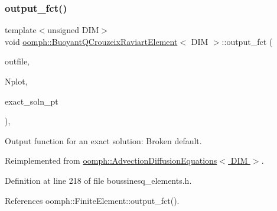 \subsubsection{\texorpdfstring{output\+\_\+fct()}{output\_fct()}\hspace{0.1cm}{\footnotesize\ttfamily [1/2]}}
{\footnotesize\ttfamily template$<$unsigned D\+IM$>$ \\
void \hyperlink{classoomph_1_1BuoyantQCrouzeixRaviartElement}{oomph\+::\+Buoyant\+Q\+Crouzeix\+Raviart\+Element}$<$ D\+IM $>$\+::output\+\_\+fct (\begin{DoxyParamCaption}\item[{std\+::ostream \&}]{outfile,  }\item[{const unsigned \&}]{Nplot,  }\item[{\hyperlink{classoomph_1_1FiniteElement_a690fd33af26cc3e84f39bba6d5a85202}{Finite\+Element\+::\+Steady\+Exact\+Solution\+Fct\+Pt}}]{exact\+\_\+soln\+\_\+pt }\end{DoxyParamCaption})\hspace{0.3cm}{\ttfamily [inline]}, {\ttfamily [virtual]}}



Output function for an exact solution\+: Broken default. 



Reimplemented from \hyperlink{classoomph_1_1AdvectionDiffusionEquations_ab1d0f6bc8d3c9c9826ac1d71f1fd148f}{oomph\+::\+Advection\+Diffusion\+Equations$<$ D\+I\+M $>$}.



Definition at line 218 of file boussinesq\+\_\+elements.\+h.



References oomph\+::\+Finite\+Element\+::output\+\_\+fct().

\mbox{\label{classoomph_1_1BuoyantQCrouzeixRaviartElement_ae1c6dc6850532af9ec618415ba31e053}} 
